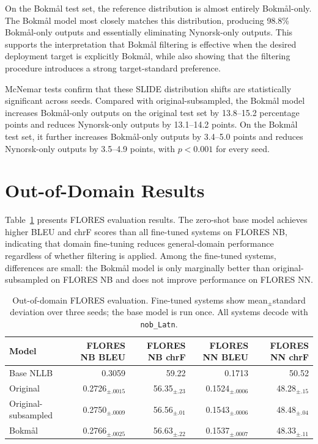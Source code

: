 \documentclass[11pt]{article}
\newcommand{\nb}{Bokm{\aa}l}
\newcommand{\nn}{Nynorsk}
\begin{document}
On the \nb{} test set, the reference distribution is almost entirely \nb{}-only. The \nb{} model most closely matches this distribution, producing 98.8\% \nb{}-only outputs and essentially eliminating \nn{}-only outputs. This supports the interpretation that \nb{} filtering is effective when the desired deployment target is explicitly \nb{}, while also showing that the filtering procedure introduces a strong target-standard preference.

McNemar tests confirm that these SLIDE distribution shifts are statistically significant across seeds. Compared with original-subsampled, the \nb{} model increases \nb{}-only outputs on the original test set by 13.8--15.2 percentage points and reduces \nn{}-only outputs by 13.1--14.2 points. On the \nb{} test set, it further increases \nb{}-only outputs by 3.4--5.0 points and reduces \nn{}-only outputs by 3.5--4.9 points, with $p<0.001$ for every seed.

\section{Out-of-Domain Results}

Table~\ref{tab:flores} presents FLORES evaluation results. The zero-shot base model achieves higher BLEU and chrF scores than all fine-tuned systems on FLORES NB, indicating that domain fine-tuning reduces general-domain performance regardless of whether filtering is applied. Among the fine-tuned systems, differences are small: the \nb{} model is only marginally better than original-subsampled on FLORES NB and does not improve performance on FLORES NN.

\begin{table}[t]
\centering
\small
\begin{tabular}{lrrrr}
\toprule
Model & FLORES NB BLEU & FLORES NB chrF & FLORES NN BLEU & FLORES NN chrF \\
\midrule
Base NLLB & 0.3059 & 59.22 & 0.1713 & 50.52 \\
Original & 0.2726$_{\pm .0015}$ & 56.35$_{\pm .23}$ & 0.1524$_{\pm .0006}$ & 48.28$_{\pm .15}$ \\
Original-subsampled & 0.2750$_{\pm .0009}$ & 56.56$_{\pm .01}$ & 0.1543$_{\pm .0006}$ & 48.48$_{\pm .04}$ \\
\nb{} & 0.2766$_{\pm .0025}$ & 56.63$_{\pm .22}$ & 0.1537$_{\pm .0007}$ & 48.33$_{\pm .11}$ \\
\bottomrule
\end{tabular}
\caption{Out-of-domain FLORES evaluation. Fine-tuned systems show mean$_{\pm}$standard deviation over three seeds; the base model is run once. All systems decode with \texttt{nob\_Latn}.}
\label{tab:flores}
\end{table}
\end{document}
